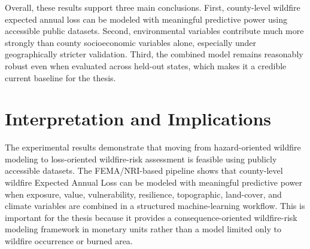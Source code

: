 \begin{table}[htbp]
\centering
\caption{Summary of county-level wildfire EAL modeling results.}
\label{tab:prelim_results_summary}
\end{table}

Overall, these results support three main conclusions. First, county-level wildfire expected annual loss can be modeled with meaningful predictive power using accessible public datasets. Second, environmental variables contribute much more strongly than county socioeconomic variables alone, especially under geographically stricter validation. Third, the combined model remains reasonably robust even when evaluated across held-out states, which makes it a credible current baseline for the thesis.

\section{Interpretation and Implications}

The experimental results demonstrate that moving from hazard-oriented wildfire modeling to loss-oriented wildfire-risk assessment is feasible using publicly accessible datasets. The FEMA/NRI-based pipeline shows that county-level wildfire Expected Annual Loss can be modeled with meaningful predictive power when exposure, value, vulnerability, resilience, topographic, land-cover, and climate variables are combined in a structured machine-learning workflow. This is important for the thesis because it provides a consequence-oriented wildfire-risk modeling framework in monetary units rather than a model limited only to wildfire occurrence or burned area.

